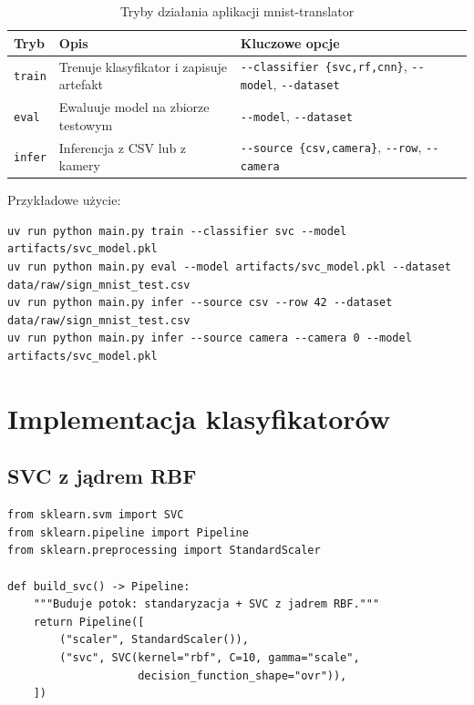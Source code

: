 \begin{table}[H]
    \centering
    \caption{Tryby działania aplikacji mnist-translator}
    \label{tab:tryby}
    \begin{tabularx}{\textwidth}{llX}
        \toprule
        \textbf{Tryb} & \textbf{Opis} & \textbf{Kluczowe opcje} \\
        \midrule
        \texttt{train}  & Trenuje klasyfikator i zapisuje artefakt
                        & \texttt{-{}-classifier \{svc,rf,cnn\}}, \texttt{-{}-model}, \texttt{-{}-dataset} \\
        \texttt{eval}   & Ewaluuje model na zbiorze testowym
                        & \texttt{-{}-model}, \texttt{-{}-dataset} \\
        \texttt{infer}  & Inferencja z CSV lub z kamery
                        & \texttt{-{}-source \{csv,camera\}}, \texttt{-{}-row}, \texttt{-{}-camera} \\
        \bottomrule
    \end{tabularx}
\end{table}

\newpage
Przykładowe użycie:
\begin{lstlisting}[style=stylePython,caption={Przyklady uruchomien CLI}]
uv run python main.py train --classifier svc --model artifacts/svc_model.pkl
uv run python main.py eval --model artifacts/svc_model.pkl --dataset data/raw/sign_mnist_test.csv
uv run python main.py infer --source csv --row 42 --dataset data/raw/sign_mnist_test.csv
uv run python main.py infer --source camera --camera 0 --model artifacts/svc_model.pkl
\end{lstlisting}

\section{Implementacja klasyfikatorów}

\subsection{SVC z jądrem RBF}

\begin{lstlisting}[style=stylePython, caption={Budowa potoku SVC (src/model/classifiers/svc.py)}, label=lst:svc]
from sklearn.svm import SVC
from sklearn.pipeline import Pipeline
from sklearn.preprocessing import StandardScaler

def build_svc() -> Pipeline:
    """Buduje potok: standaryzacja + SVC z jadrem RBF."""
    return Pipeline([
        ("scaler", StandardScaler()),
        ("svc", SVC(kernel="rbf", C=10, gamma="scale",
                    decision_function_shape="ovr")),
    ])
\end{lstlisting}

